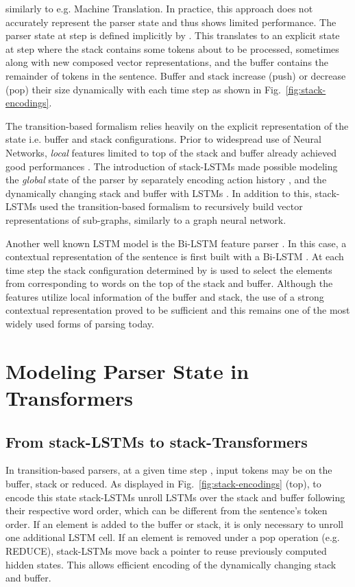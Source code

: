 \documentclass[11pt,a4paper]{article}
\begin{document}
similarly to e.g. Machine Translation. In practice, this approach does not accurately represent the parser state and thus shows limited performance. The parser state at step  is defined implicitly by . This translates to an explicit state at step  where the stack contains some tokens about to be processed, sometimes along with new composed vector representations, and the buffer contains the remainder of tokens in the sentence. Buffer and stack increase (push) or decrease (pop) their size dynamically with each time step as shown in Fig.~\ref{fig:stack-encodings}.

The transition-based formalism relies heavily on the explicit representation of the state i.e. buffer and stack configurations. Prior to widespread use of Neural Networks, \textit{local} features limited to top of the stack and buffer already achieved good performances \cite[inter-alia]{nivre2007maltparser,zhang-nivre-2011-transition}. The introduction of stack-LSTMs \cite{dyer2015transition} made possible modeling the \textit{global} state of the parser by separately encoding action history , and the dynamically changing stack and buffer with LSTMs \cite{hochreiter1997long}. In addition to this, stack-LSTMs used the transition-based formalism to recursively build vector representations of sub-graphs, similarly to a graph neural network. 

Another well known LSTM model is the Bi-LSTM feature parser \cite{kiperwasser-goldberg-2016-simple,dozat2016deep}. In this case, a contextual representation of the sentence is first built with a Bi-LSTM . At each time step  the stack configuration determined by  is used to select the elements from  corresponding to words on the top of the stack and buffer. Although the features utilize local information of the buffer and stack, the use of a strong contextual representation proved to be sufficient and this remains one of the most widely used forms of parsing today.

\section{Modeling Parser State in Transformers}
\label{section:state}

\subsection{From stack-LSTMs to stack-Transformers}

In transition-based parsers, at a given time step , input tokens  may be on the buffer, stack or reduced. As displayed in Fig.~\ref{fig:stack-encodings} (top), to encode this state stack-LSTMs unroll LSTMs over the stack and buffer following their respective word order, which can be different from the sentence's token order. If an element is added to the buffer or stack, it is only necessary to unroll one additional LSTM cell. If an element is removed under a pop operation (e.g. \textrm{REDUCE}), stack-LSTMs move back a pointer to reuse previously computed hidden states. This allows efficient encoding of the dynamically changing stack and buffer.
\end{document}
